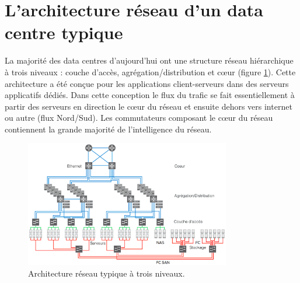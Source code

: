 \section{L'architecture réseau d'un data centre typique}

La majorité des data centres d'aujourd'hui ont une structure réseau hiérarchique à trois niveaux : couche d'accès, agrégation/distribution et cœur (figure \ref{legacy_archi}). Cette architecture a été conçue pour les applications client-serveurs dans des serveurs applicatifs dédiés. Dans cette conception le flux du trafic se fait essentiellement à partir des serveurs en direction le cœur du réseau et ensuite dehors vers internet ou autre (flux Nord/Sud). Les commutateurs composant le cœur du réseau contiennent la grande majorité de l'intelligence du réseau. 



\begin{figure}[h]
\begin{center}
\includegraphics[width=0.8\textwidth]{images/LegacyNetworkArchitecture} 
\caption{Architecture réseau typique à trois niveaux. \cite{cloudReadyNetworkJuniper}} \label{legacy_archi}
\end{center}
\end{figure}


